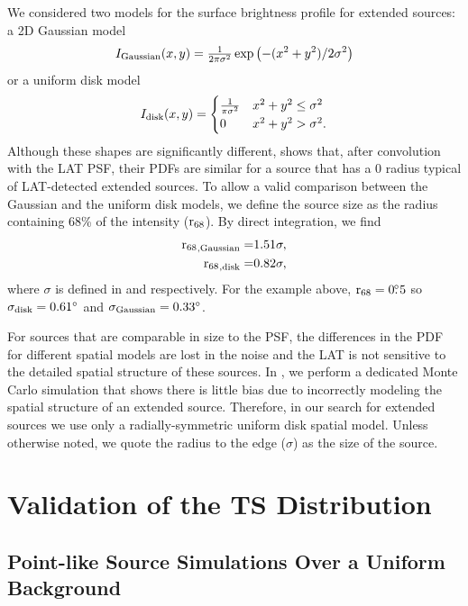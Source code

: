 We considered two models for the
surface brightness profile for extended sources: a 2D Gaussian model
\begin{equation}\eqnlabel{gauss_pdf}
  I_\text{Gaussian}(x,y)=\tfrac{1}{2\pi\sigma^2}\exp\left(-(x^2+y^2)/2\sigma^2\right)
\end{equation}
or a uniform disk model
\begin{equation}\eqnlabel{disk_pdf}
  I_\text{disk}(x,y)=
  \begin{cases}
    \frac{1}{\pi\sigma^2} & x^2+y^2\le\sigma^2 \\
    0                      & x^2+y^2>\sigma^2.
  \end{cases}
\end{equation}
Although these shapes are significantly different,
 shows that, after convolution with the
LAT PSF, their PDFs are similar for a source that has a 0 radius
typical of LAT-detected extended sources.  To allow a valid comparison
between the Gaussian and the uniform disk models, we define the source
size as the radius containing 68\% of the intensity (${\mathrm{r}_{68}}$).
By direct integration, we find
\begin{align}
  {\ensuremath{\mathrm{r}_{68}}}_\text{,Gaussian}=&1.51\sigma, \\
  {\mathrm{r}_{68}}_\text{,disk}=&0.82\sigma, 
\end{align}
where $\sigma$ is defined
in  and  respectively.
For the example above, ${\mathrm{r}_{68}}=0\mbox{$.\!\!^\circ$}5$ so $\sigma_\text{disk}=0.61^\circ$
and $\sigma_\text{Gaussian}=0.33^\circ$.

For sources that are comparable in size to the PSF, the differences in
the PDF for different spatial models are lost in the noise and the LAT
is not sensitive to the detailed spatial structure of these sources.
In , we perform a dedicated Monte
Carlo simulation that shows there is little bias due to incorrectly
modeling the spatial structure of an extended source.  Therefore, in our
search for extended sources we use only a radially-symmetric uniform disk
spatial model. Unless otherwise noted, we quote the radius to the edge
($\sigma$) as the size of the source.

\section{Validation of the TS Distribution}

\subsection{Point-like Source Simulations Over a Uniform Background}


